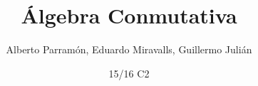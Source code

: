 \documentclass[palatino]{apuntes}
\title{Álgebra Conmutativa}
\author{Alberto Parramón, Eduardo Miravalls, Guillermo Julián}
\date{15/16 C2}
\begin{document}
\pagestyle{plain}
\maketitle

\renewcommand{\chaptername}{Tema}

\renewcommand\thechapter{\arabic{chapter}}

\newcommand{\field}{\ensuremath{\mathbb{F}}\xspace}
\newcommand{\K}{\ensuremath{\mathbb{K}}\xspace}
\renewcommand\tq{:}
\renewcommand{\U}{\ensuremath{\mathcal{U}}\xspace}
\newcommand{\zero}{\ensuremath{\mathbb{0}}\xspace}
\newcommand{\one}{\ensuremath{\mathbb{1}}\xspace}
\newcommand{\cls}{\gor} %
\newcommand{\nil}{\mop{Nil}}

\newcommand{\zerogen}{\ensuremath{\mathopen{\langle} \zero \mathclose{\rangle}}} %

\newcommand{\st}{\text{ tal que }}
\newcommand{\wrt}{\text{ con respecto de }}
\newcommand{\ie}{\text{, es decir, }}

\tableofcontents
\newpage




\appendix




\nocite{reidAG,reidCA}
{}

\printindex
\end{document}
